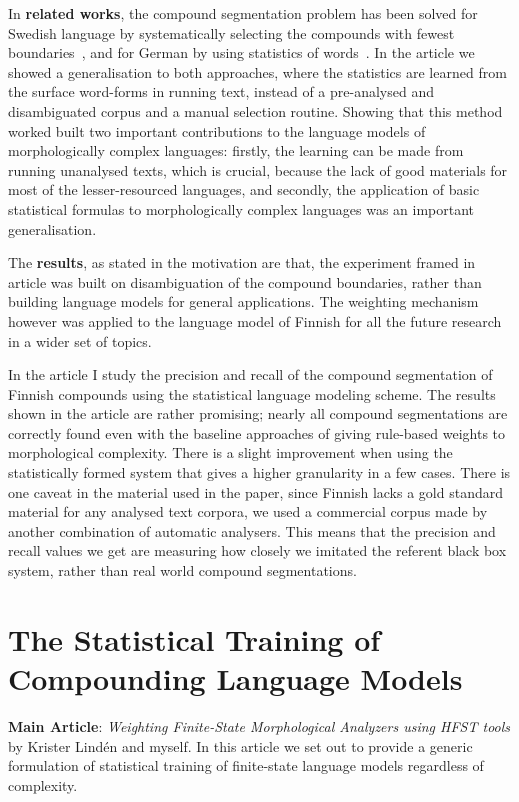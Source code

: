 \documentclass[officiallayout]{unihelcompling}
\begin{document}
In \textbf{related works}, the compound segmentation problem has been solved
for Swedish language by systematically selecting the compounds with fewest boundaries~\citep{karlsson1992swetwol}, and for German by using statistics
of words~\citep{schiller2006german}. In the article we showed a generalisation
to both approaches, where the statistics are learned from the surface
word-forms in running text, instead of a pre-analysed and disambiguated corpus
and a manual selection routine.  Showing that this method worked built two
important contributions to the language models of morphologically complex
languages: firstly, the learning can be made from running unanalysed texts,
which is crucial, because the lack of good materials for most of the
lesser-resourced languages, and secondly, the application of basic statistical
formulas to morphologically complex languages was an important generalisation.

The \textbf{results}, as stated in the motivation are that, the experiment
framed in article was built on disambiguation of the compound boundaries,
rather than building language models for general applications. The weighting
mechanism however was applied to the language model of Finnish for all the
future research in a wider set of topics.

In the article I study the precision and recall of the compound segmentation
of Finnish compounds using the statistical language modeling scheme. The
results shown in the article are rather promising; nearly all compound
segmentations are correctly found even with the baseline approaches of giving
rule-based weights to morphological complexity. There is a slight improvement
when using the statistically formed system that gives a higher
granularity in a few cases. There is one caveat in the material used in the
paper, since Finnish lacks a gold standard material for any analysed text
corpora, we used a commercial corpus made by another combination
of automatic analysers. This means that the precision and recall values we
get are measuring how closely we imitated the referent black box system, rather
than real world compound segmentations.

\section{The Statistical Training of Compounding Language Models}
\label{sec:training-compounds}

\textbf{Main Article}: \emph{Weighting Finite-State Morphological Analyzers
using HFST tools} by Krister Lindén and myself. In this article we set out
to provide a generic formulation of statistical training of finite-state
language models regardless of complexity.
\end{document}
